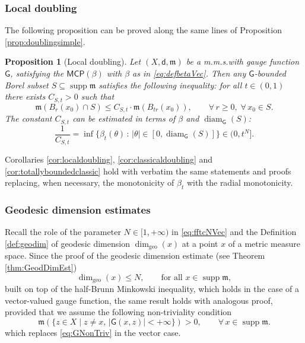 \documentclass[11pt,a4paper]{article}
\theoremstyle{plain}
\newtheorem{proposition}[theorem]{Proposition}
\theoremstyle{definition}
\theoremstyle{remark}
\numberwithin{equation}{section}
\DeclareMathOperator{\supp}{\mathrm{supp}}
\newcommand{\MCP}{\mathsf{MCP}}
\DeclareMathOperator{\diam}{\mathrm{diam}}
\newcommand{\mm}{\mathfrak m}
\newcommand{\sfd}{\mathsf d}
\newcommand{\sfG}{\mathsf G}
\newcommand{\NN}{\dim_{\mathrm{geo}}}
\begin{document}
\subsubsection*{Local doubling}

The following proposition can be proved along the same lines of Proposition \ref{prop:doublingsimple}.

\begin{proposition}[Local doubling]\label{prop:doublingsimpleVec2}
Let $(X,\sfd,\mm)$ be a m.m.s.\@ with gauge function $\sfG$, satisfying the $\MCP(\beta)$ with $\beta$ as in \eqref{eq:defbetaVec}. Then any $\sfG$-bounded Borel subset $S\subseteq \supp\mm$ satisfies the following inequality: for all $t\in (0,1)$ there exists $C_{S,t}>0$ such that
\begin{equation}\label{eq:doublingsimpleVec2}
\mm(B_{r}(x_0)\cap S)\leq C_{S,t}\cdot \mm(B_{tr}(x_0)),\qquad \forall\, r\geq 0,\;  \forall\, x_0\in S.
\end{equation}
The constant $C_{S,t}$ can be estimated in terms of $\beta$ and $\diam_{\sfG}(S)$:
\begin{equation}\label{eq:crRVec2}
\frac{1}{C_{S,t}} =\inf\{\beta_{t}(\theta)\, :\,  |\theta| \in [0,\diam_{\sfG}(S)] \}  \in (0,t^N].
\end{equation}
\end{proposition}


Corollaries \ref{cor:localdoubling}, \ref{cor:classicaldoubling} and \ref{cor:totallyboundedclassic} hold with verbatim the same statements and proofs replacing, when necessary, the monotonicity of $\beta_t$ with the radial monotonicity.


\subsubsection*{Geodesic dimension estimates}

Recall the role of the parameter $N\in [1,+\infty)$ in \eqref{eq:fftcNVec} and the Definition \ref{def:geodim} of geodesic dimension $\NN(x)$ at a point $x$  of a metric measure space. Since the proof of the geodesic dimension estimate (see Theorem \ref{thm:GeodDimEst})
\begin{equation}
\NN(x) \leq N,\qquad  \text{for all }  x\in \supp\mm,
\end{equation}
built on top of the half-Brunn Minkowski inequality, which holds in the case of a vector-valued gauge function, the same result holds with analogous proof,  provided that we assume the following non-triviality condition
\begin{equation}\label{eq:GNonTrivVec}
\mm(\{z\in X \mid  z\neq x, \,  |\sfG(x, z)|<+\infty\})>0, \qquad \forall\, x\in \supp\mm.
\end{equation}
which replaces \eqref{eq:GNonTriv} in the vector case.
\end{document}
